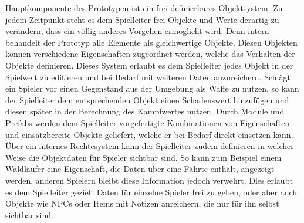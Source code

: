 Hauptkomponente des Prototypen ist ein frei definierbares Objektsystem. Zu jedem Zeitpunkt steht es dem Spielleiter frei Objekte und Werte derartig zu verändern, dass ein völlig anderes Vorgehen ermöglicht wird. Denn intern behandelt der Prototyp alle Elemente als gleichwertige Objekte. Diesen Objekten können verschiedene Eigenschaften zugeordnet werden, welche das Verhalten der Objekte definieren. Dieses System erlaubt es dem Spielleiter jedes Objekt in der Spielwelt zu editieren und bei Bedarf mit weiteren Daten anzureichern. Schlägt ein Spieler vor einen Gegenstand aus der Umgebung als Waffe zu nutzen, so kann der Spielleiter dem entsprechenden Objekt einen Schadenswert hinzufügen und diesen später in der Berechnung des Kampfwertes nutzen.\newline
Durch Module und Prefabs werden dem Spielleiter vorgefertigte Kombinationen von Eigenschaften und einsatzbereite Objekte geliefert, welche er bei Bedarf direkt einsetzen kann.\newline
Über ein internes Rechtesystem kann der Spielleiter zudem definieren in welcher Weise die Objektdaten für Spieler sichtbar sind. So kann zum Beispiel einem Waldläufer eine Eigenschaft, die Daten über eine Fährte enthält, angezeigt werden, anderen Spielern bleibt diese Information jedoch verwehrt. Dies erlaubt es dem Spielleiter gezielt Daten für einzelne Spieler frei zu geben, oder aber auch Objekte wie NPCs oder Items mit Notizen anreichern, die nur für ihn selbst sichtbar sind.\newline

